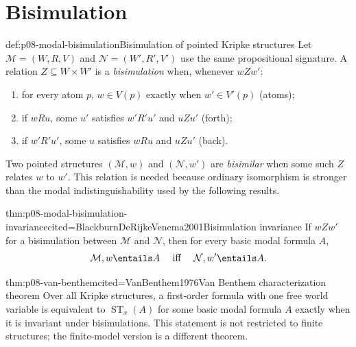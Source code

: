 \section{Bisimulation}

\begin{hbdefinition}{def:p08-modal-bisimulation}{Bisimulation of pointed Kripke structures}
Let \(\mathcal M=(W,R,V)\) and
\(\mathcal N=(W',R',V')\) use the same propositional signature.  A relation
\(Z\subseteq W\times W'\) is a \emph{bisimulation} when, whenever \(wZw'\):
\begin{enumerate}
\item for every atom \(p\), \(w\in V(p)\) exactly when \(w'\in V'(p)\)
      (atoms);
\item if \(wRu\), some \(u'\) satisfies \(w'R'u'\) and \(uZu'\) (forth);
\item if \(w'R'u'\), some \(u\) satisfies \(wRu\) and \(uZu'\) (back).
\end{enumerate}
Two pointed structures \((\mathcal M,w)\) and \((\mathcal N,w')\) are
\emph{bisimilar} when some such \(Z\) relates \(w\) to \(w'\).  This relation
is needed because ordinary isomorphism is stronger than the modal
indistinguishability used by the following results.
\end{hbdefinition}

\begin{hbtheorem}{thm:p08-modal-bisimulation-invariance}{cited=BlackburnDeRijkeVenema2001}{Bisimulation invariance}
If \(wZw'\) for a bisimulation between \(\mathcal M\) and \(\mathcal N\),
then for every basic modal formula \(A\),
\[
 \mathcal M,w\entails A
 \quad\text{ iff }\quad
 \mathcal N,w'\entails A.
\]
\end{hbtheorem}

\begin{hbtheorem}{thm:p08-van-benthem}{cited=VanBenthem1976}{Van Benthem characterization theorem}
Over all Kripke structures, a first-order formula with one free world variable
is equivalent to \(\operatorname{ST}_x(A)\) for some basic modal formula
\(A\) exactly when it is invariant under bisimulations.  This statement is not
restricted to finite structures; the finite-model version is a different
theorem.
\end{hbtheorem}

